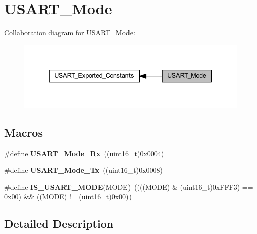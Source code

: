 \hypertarget{group___u_s_a_r_t___mode}{}\section{U\+S\+A\+R\+T\+\_\+\+Mode}
\label{group___u_s_a_r_t___mode}
Collaboration diagram for U\+S\+A\+R\+T\+\_\+\+Mode\+:
\nopagebreak
\begin{figure}[H]
\begin{center}
\leavevmode
\includegraphics[width=337pt]{group___u_s_a_r_t___mode}
\end{center}
\end{figure}
\subsection*{Macros}
\begin{DoxyCompactItemize}
\item 
\mbox{\label{group___u_s_a_r_t___mode_gafefcc3d3c1a1f83b425784fa6289aecf}} 
\#define {\bfseries U\+S\+A\+R\+T\+\_\+\+Mode\+\_\+\+Rx}~((uint16\+\_\+t)0x0004)
\item 
\mbox{\label{group___u_s_a_r_t___mode_ga22b2813509a062435ea68d086ec565b4}} 
\#define {\bfseries U\+S\+A\+R\+T\+\_\+\+Mode\+\_\+\+Tx}~((uint16\+\_\+t)0x0008)
\item 
\mbox{\label{group___u_s_a_r_t___mode_gae9140e5ca405d2377fe0e82c79e136a2}} 
\#define {\bfseries I\+S\+\_\+\+U\+S\+A\+R\+T\+\_\+\+M\+O\+DE}(M\+O\+DE)~((((M\+O\+DE) \& (uint16\+\_\+t)0x\+F\+F\+F3) == 0x00) \&\& ((\+M\+O\+D\+E) != (uint16\+\_\+t)0x00))
\end{DoxyCompactItemize}


\subsection{Detailed Description}
